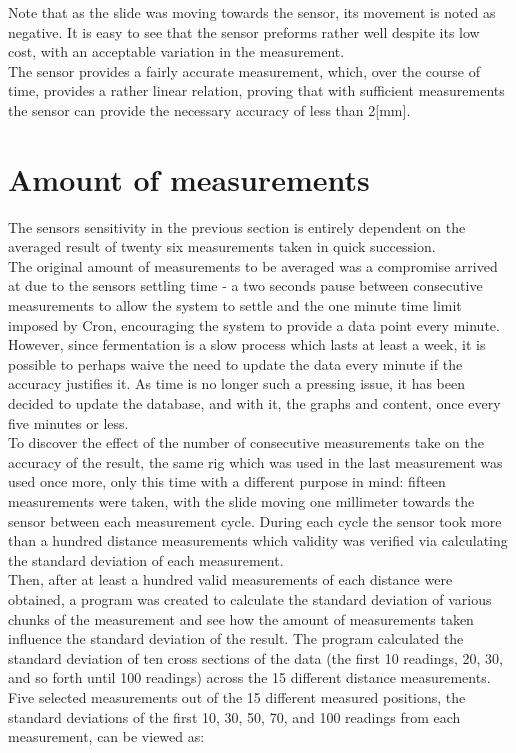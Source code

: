 \documentclass[twoside]{ctuthesis}
\theoremstyle{plain}
\theoremstyle{definition}
\theoremstyle{note}
\begin{document}
Note that as the slide was moving towards the sensor, its movement is noted as negative. 
It is easy to see that the sensor preforms rather well despite its low cost, with an acceptable variation in the measurement.\\
The sensor provides a fairly accurate measurement, which, over the course of time, provides a rather linear relation, proving that with sufficient measurements the sensor can provide the necessary accuracy of less than 2[mm].

\section{Amount of measurements}
The sensors sensitivity in the previous section is entirely dependent on the averaged result of twenty six measurements taken in quick succession.\\
The original amount of measurements to be averaged was a compromise arrived at due to the sensors settling time - a two seconds pause between consecutive measurements to allow the system to settle and the one minute time limit imposed by Cron, encouraging the system to provide a data point every minute. However, since fermentation is a slow process which lasts at least a week\cite{Joy_Of_Brewing}, it is possible to perhaps waive the need to update the data every minute if the accuracy justifies it. As time is no longer such a pressing issue, it has been decided to update the database, and with it, the graphs and content, once every five minutes or less.\\
To discover the effect of the number of consecutive measurements take on the accuracy of the result, the same rig which was used in the last measurement was used once more, only this time with a different purpose in mind: fifteen measurements were taken, with the slide moving one millimeter towards the sensor between each measurement cycle. During each cycle the sensor took more than a hundred distance measurements which validity was verified via calculating the standard deviation of each measurement.\\
Then, after at least a hundred valid measurements of each distance were obtained, a program was created to calculate the standard deviation of various chunks of the measurement and see how the amount of measurements taken influence the standard deviation of the result. The program calculated the standard deviation of ten cross sections of the data (the first 10 readings, 20, 30, and so forth until 100 readings) across the 15 different distance measurements.\\
Five selected measurements out of the 15 different measured positions, the standard deviations of the first 10, 30, 50, 70, and 100 readings from each measurement, can be viewed as:
 
\end{document}
